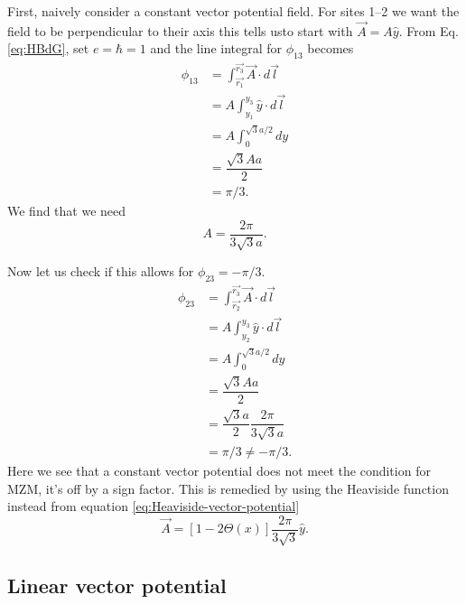 First, naively consider a constant vector potential field.
For sites 1--2 we want the field to be perpendicular to their axis this tells usto start with $\vec{A} = A\hat{y}$.
From Eq. \ref{eq:HBdG}, set $e=\hbar=1$ and the line integral for $\phi_{13}$ becomes
\begin{align}
  \phi_{13} &= \int_{\vec{r_1}}^{\vec{r_3}} \vec{A} \cdot d\vec{l} \nonumber \\
  &= A \int_{y_1}^{y_3} \hat{y} \cdot d\vec{l} \nonumber \\
  &= A \int_0^{\sqrt{3}a/2} dy \nonumber \\
  &= \dfrac{\sqrt{3} A a}{2} \nonumber \\
  &= \pi/3. \nonumber
\end{align}
We find that we need
\begin{equation} \label{constant vector potential magnitude}
  A = \dfrac{2 \pi}{3 \sqrt{3} a}.
\end{equation}

Now let us check if this allows for $\phi_{23} = -\pi/3$.
\begin{align}
  \phi_{23} &= \int_{\vec{r_2}}^{\vec{r_3}} \vec{A} \cdot d\vec{l} \nonumber \\
  &= A \int_{y_2}^{y_3} \hat{y} \cdot d\vec{l} \nonumber \\
  &= A \int^{\sqrt{3}a/2}_0 dy \nonumber \\
  &= \dfrac{\sqrt{3} A a}{2} \nonumber \\
  &= \dfrac{\sqrt{3} a}{2} \dfrac{2 \pi}{3 \sqrt{3} a} \nonumber \\
  &= \pi/3 \neq -\pi/3. \nonumber
\end{align}
Here we see that a constant vector potential does not meet the condition for MZM, it's off by a sign factor.
This is remedied by using the Heaviside function instead from equation \ref{eq:Heaviside-vector-potential}
\begin{equation}
  \vec{A} = [1-2\Theta(x)] \dfrac{2\pi}{3\sqrt{3}}\hat{y}. \nonumber
\end{equation}

\subsection{Linear vector potential}

